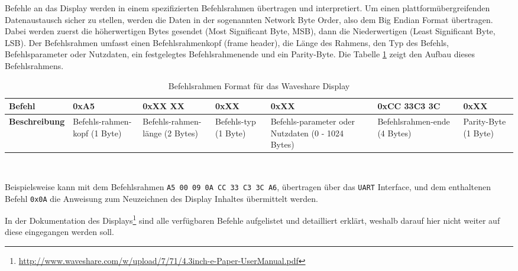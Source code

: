 Befehle an das Display werden in einem spezifizierten Befehlsrahmen übertragen und interpretiert. Um einen plattformübergreifenden Datenaustausch sicher zu stellen, werden die Daten in der sogenannten Network Byte Order, also dem Big Endian Format übertragen. Dabei werden zuerst die höherwertigen Bytes gesendet (Most Significant Byte, MSB), dann die Niederwertigen (Least Significant Byte, LSB).
Der Befehlsrahmen umfasst einen Befehlsrahmenkopf (frame header), die Länge des Rahmens, den Typ des Befehls, Befehlsparameter oder Nutzdaten, ein festgelegtes Befehlsrahmenende und ein Parity-Byte. Die Tabelle \ref{tab:Befehlsrahmen} zeigt den Aufbau dieses Befehlsrahmens.

\begin{table}[h]
\begin{tabular}{|m{2.7cm}||m{1.6cm}|m{1.9cm}|m{1.6cm}|m{1.9cm}|m{2.7cm}|m{1.4cm}|}
\hline
\textbf{Befehl} & 0xA5 & 0xXX XX & 0xXX & 0xXX & 0xCC 33C3 3C & 0xXX\\
\hline
\textbf{Beschreibung} & Befehls-rahmen-kopf \newline(1 Byte) & Befehls-rahmen-länge \newline(2 Bytes) & Befehls-typ \newline (1 Byte) & Befehls-parameter oder Nutzdaten \newline(0 - 1024 Bytes) & Befehlsrahmen-ende \newline(4 Bytes) & Parity-Byte \newline(1 Byte)\\
\hline
\end{tabular}
\\
\caption{Befehlsrahmen Format für das Waveshare Display} 
\label{tab:Befehlsrahmen}
\end{table}

Beispielsweise kann mit dem Befehlsrahmen \texttt{A5 00 09 0A CC 33 C3 3C A6}, übertragen über das \texttt{UART} Interface, und dem enthaltenen Befehl \texttt{0x0A} die Anweisung zum Neuzeichnen des Display Inhaltes übermittelt werden.

In der Dokumentation des Displays\footnote{\url{http://www.waveshare.com/w/upload/7/71/4.3inch-e-Paper-UserManual.pdf}} sind alle verfügbaren Befehle aufgelistet und detailliert erklärt, weshalb darauf hier nicht weiter auf diese eingegangen werden soll.  
 

